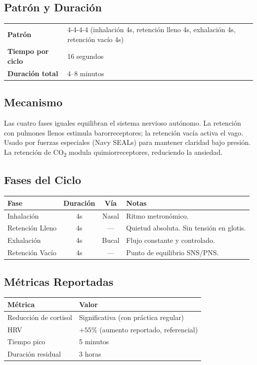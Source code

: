 \documentclass[12pt,a4paper]{article}
\begin{document}
\subsection*{Patrón y Duración}
\begin{tabularx}{\textwidth}{lX}
    \textbf{Patrón} & 4-4-4-4 (inhalación 4s, retención lleno 4s, exhalación 4s, retención vacío 4s) \\
    \textbf{Tiempo por ciclo} & 16 segundos \\
    \textbf{Duración total} & 4--8 minutos \\
\end{tabularx}

\subsection*{Mecanismo}
Las cuatro fases iguales equilibran el sistema nervioso autónomo. La retención con
pulmones llenos estimula barorreceptores; la retención vacía activa el vago.
Usado por fuerzas especiales (Navy SEALs) para mantener claridad bajo presión.
La retención de CO\textsubscript{2} modula quimiorreceptores, reduciendo la ansiedad.

\subsection*{Fases del Ciclo}
\begin{tabularx}{\textwidth}{lccX}
    \toprule
    \textbf{Fase} & \textbf{Duración} & \textbf{Vía} & \textbf{Notas} \\
    \midrule
    Inhalación & 4s & Nasal & Ritmo metronómico. \\
    Retención Lleno & 4s & — & Quietud absoluta. Sin tensión en glotis. \\
    Exhalación & 4s & Bucal & Flujo constante y controlado. \\
    Retención Vacío & 4s & — & Punto de equilibrio SNS/PNS. \\
    \bottomrule
\end{tabularx}

\subsection*{Métricas Reportadas}
\begin{tabularx}{\textwidth}{lX}
    \toprule
    \textbf{Métrica} & \textbf{Valor} \\
    \midrule
    Reducción de cortisol & Significativa (con práctica regular) \\
    HRV & $+55\%$ (aumento reportado, referencial) \\
    Tiempo pico & 5 minutos \\
    Duración residual & 3 horas \\
    \bottomrule
\end{tabularx}
\end{document}
